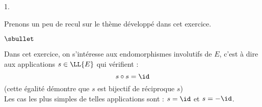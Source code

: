 \documentclass[11pt]{article}%
\begin{document}
\begin{noliste}{1.}


\newpage


\begin{remark}%
  Prenons un peu de recul sur le thème développé dans cet exercice.
  \begin{noliste}{$\sbullet$}
  \item Dans cet exercice, on s'intéresse aux endomorphismes
    involutifs de $E$, c'est à dire aux applications $s \in \LL{E}$
    qui vérifient :
    \[
    s \circ s = \id
    \]
    (cette égalité démontre que $s$ est bijectif de réciproque $s$)\\
    Les cas les plus simples de telles applications sont : $s = \id$
    et $s = -\id$.


\end{noliste}
\end{remark}
\end{noliste}
\end{document}
